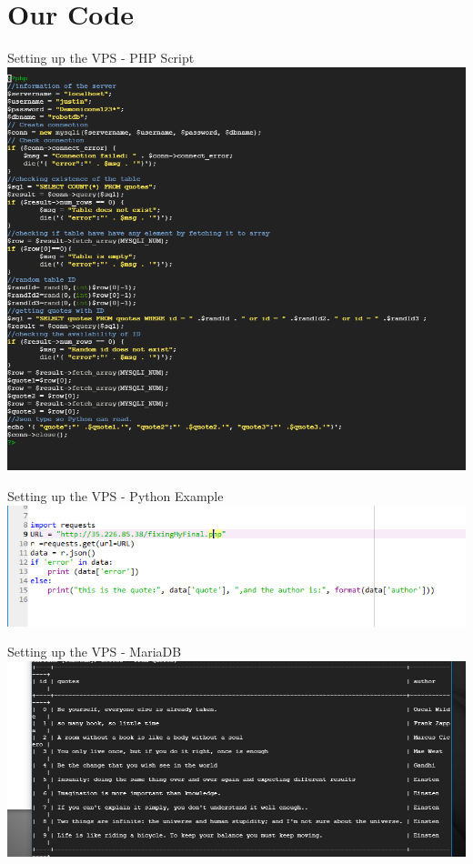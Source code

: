 \section{Our Code}
    
    \frame{\sectionpage}

\begin{frame}{Setting up the VPS - PHP Script}
	\centering
	\includegraphics[width =0.7\linewidth]{images/CodeFromphpFile.PNG}
\end{frame}
\begin{frame}{Setting up the VPS - Python Example}
	\centering
	\includegraphics[width =1.1\linewidth]{images/Capture.PNG}
\end{frame}
\begin{frame}{Setting up the VPS - MariaDB}
	\centering
	\includegraphics[width =1\linewidth]{images/tablemysql.PNG}
\end{frame}
